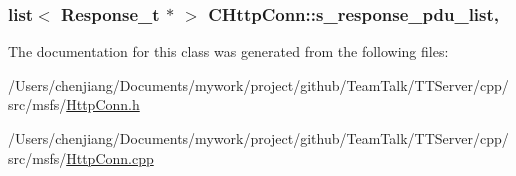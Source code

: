 \subsubsection[{s\+\_\+response\+\_\+pdu\+\_\+list}]{\setlength{\rightskip}{0pt plus 5cm}list$<$ {\bf Response\+\_\+t} $\ast$ $>$ C\+Http\+Conn\+::s\+\_\+response\+\_\+pdu\+\_\+list\hspace{0.3cm}{\ttfamily [static]}, {\ttfamily [protected]}}\label{class_c_http_conn_a120c90e3459db4e7a25f7d2bf491d147}


The documentation for this class was generated from the following files\+:\begin{DoxyCompactItemize}
\item 
/\+Users/chenjiang/\+Documents/mywork/project/github/\+Team\+Talk/\+T\+T\+Server/cpp/src/msfs/\hyperlink{msfs_2_http_conn_8h}{Http\+Conn.\+h}\item 
/\+Users/chenjiang/\+Documents/mywork/project/github/\+Team\+Talk/\+T\+T\+Server/cpp/src/msfs/\hyperlink{msfs_2_http_conn_8cpp}{Http\+Conn.\+cpp}\end{DoxyCompactItemize}
